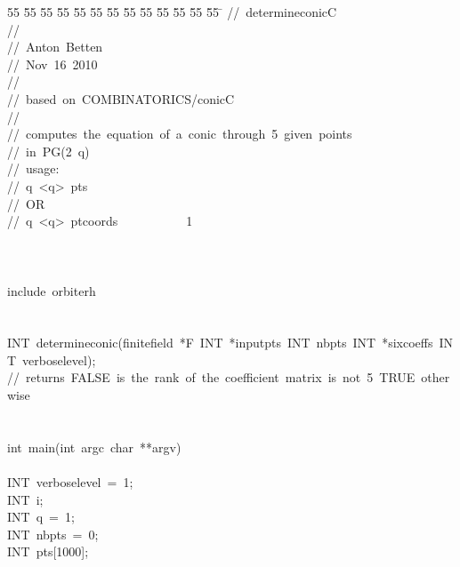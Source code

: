 %
%
\begin{tabbing}
55 \= 55 \= 55 \= 55 \= 55 \= 55 \= 55 \= 55 \= 55 \= 55 \= 55 \= 55 \= 55 \= \kill
//\ determineconicC\\[0pt]
//\ \\[0pt]
//\ Anton\ Betten\\[0pt]
//\ Nov\ 16\ 2010\\[0pt]
//\\[0pt]
//\ based\ on\ COMBINATORICS/conicC\\[0pt]
//\\[0pt]
//\ computes\ the\ equation\ of\ a\ conic\ through\ 5\ given\ points\\[0pt]
//\ in\ PG(2\ q)\\[0pt]
//\ usage:\\[0pt]
//\ q\ <q>\ pts\ <p1>\ <p2>\ <p3>\ <p4>\ <p5>\\[0pt]
//\ OR\\[0pt]
//\ q\ <q>\ ptcoords\ <x1>\ <y1>\ <z1>\ <x2>\ <y2>\ <z2>\ \ <x4>\ <y5>\ <z5>\ 1\\[0pt]
\\[0pt]
\\[0pt]
\\[0pt]
include\ orbiterh\\[0pt]
\\[0pt]
\\[0pt]
INT\ determineconic(finitefield\ *F\ INT\ *inputpts\ INT\ nbpts\ INT\ *sixcoeffs\ INT\ verboselevel);\\[0pt]
//\ returns\ FALSE\ is\ the\ rank\ of\ the\ coefficient\ matrix\ is\ not\ 5\ TRUE\ otherwise\\[0pt]
\\[0pt]
\\[0pt]
int\ main(int\ argc\ char\ **argv)\\[0pt]
\\[0pt]
\>INT\ verboselevel\ =\ 1;\\[0pt]
\>INT\ i;\\[0pt]
\>INT\ q\ =\ 1;\\[0pt]
\>INT\ nbpts\ =\ 0;\\[0pt]
\>INT\ pts[1000];\\[0pt]

\end{tabbing}
